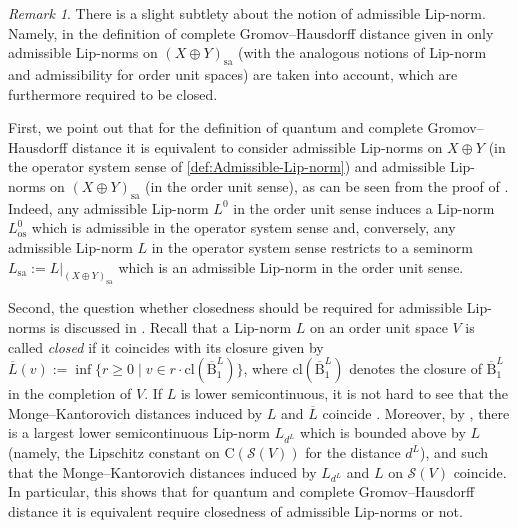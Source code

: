 \documentclass{amsart}
\theoremstyle{plain}
\theoremstyle{definition}
\theoremstyle{remark}
\newtheorem{remark}[theorem]{Remark}
\begin{document}
	\begin{remark}
		There is a slight subtlety about the notion of admissible Lip-norm.
		Namely, in the definition of complete Gromov--Hausdorff distance given in \cite{KL07} only admissible Lip-norms on $(X \oplus Y)_\mathrm{sa}$ (with the analogous notions of Lip-norm and admissibility for order unit spaces) are taken into account, which are furthermore required to be closed.
		
		First, we point out that for the definition of quantum and complete Gromov--Hausdorff distance it is equivalent to consider admissible Lip-norms on $X \oplus Y$ (in the operator system sense of \autoref{def:Admissible-Lip-norm}) and admissible Lip-norms on $(X \oplus Y)_\mathrm{sa}$ (in the order unit sense), as can be seen from the proof of \cite[Lemma 2.12]{KK22}.
		Indeed, any admissible Lip-norm $L^0$ in the order unit sense induces a Lip-norm $L^0_\mathrm{os}$ which is admissible in the operator system sense and, conversely, any admissible Lip-norm $L$ in the operator system sense restricts to a seminorm $L_\mathrm{sa} := L|_{(X \oplus Y)_\mathrm{sa}}$ which is an admissible Lip-norm in the order unit sense.
		
		Second, the question whether closedness should be required for admissible Lip-norms is discussed in \cite[p.\@ 319]{Li06}.
		Recall that a Lip-norm $L$ on an order unit space $V$ is called \emph{closed} if it coincides with its closure given by $\overline{L}(v) := \inf \{r \geq 0 \mid v \in r \cdot \mathrm{cl}(\overline{\mathrm{B}}_1^L)\}$, where $\mathrm{cl}(\overline{\mathrm{B}}_1^L)$ denotes the closure of $\overline{\mathrm{B}}_1^L$ in the completion of $V$.
		If $L$ is lower semicontinuous, it is not hard to see that the Monge--Kantorovich distances induced by $L$ and $\overline{L}$ coincide \cite[Proposition 4.4]{Rie99}.
		Moreover, by \cite[Theorem 4.2]{Rie99}, there is a largest lower semicontinuous Lip-norm $L_{d^L}$ which is bounded above by $L$ (namely, the Lipschitz constant on $\mathrm{C}(\mathcal{S}(V))$ for the distance $d^L$), and such that the Monge--Kantorovich distances induced by $L_{d^L}$ and $L$ on $\mathcal{S}(V)$ coincide.
		In particular, this shows that for quantum and complete Gromov--Hausdorff distance it is equivalent require closedness of admissible Lip-norms or not.
	\end{remark}
	
\end{document}
